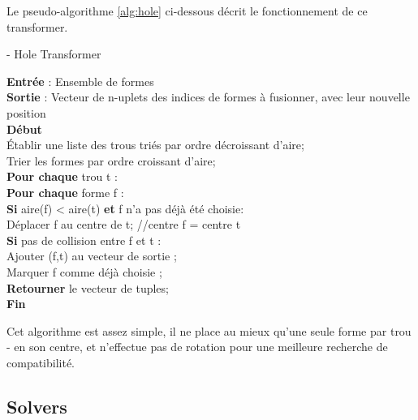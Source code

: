 Le pseudo-algorithme \ref{alg:hole} ci-dessous décrit le fonctionnement de ce transformer.

\begin{algorithm}
    \caption{- Hole Transformer}
    \label{alg:hole}   
    \textbf{Entrée} : Ensemble de formes\\
    \textbf{Sortie} : Vecteur de n-uplets des indices de formes à fusionner, avec leur nouvelle position\\

    \textbf{Début}\\
    \hspace{0.5cm}Établir une liste des trous triés par ordre décroissant d'aire;\\
    \hspace{0.5cm}Trier les formes par ordre croissant d'aire;\\
    \hspace{0.5cm}\textbf{Pour chaque} trou t :\\
        \hspace{1cm}\textbf{Pour chaque} forme f :\\
        \hspace{1cm}\textbf{Si} aire(f) < aire(t) \textbf{et} f n'a pas déjà été choisie:\\
            \hspace{1.5cm}Déplacer f au centre de t; //centre f = centre t \\
            \hspace{1.5cm}\textbf{Si} pas de collision entre f et t :\\
                    \hspace{2cm}Ajouter (f,t) au vecteur de sortie ; \\
                    \hspace{2cm}Marquer f comme déjà choisie ;\\
    \hspace{0.5cm}\textbf{Retourner} le vecteur de tuples;\\
    \textbf{Fin}\\
\end{algorithm}

Cet algorithme est assez simple, il ne place au mieux qu'une seule forme par trou - en son centre, et n'effectue pas de rotation pour une meilleure recherche de compatibilité.



\subsection{Solvers}

